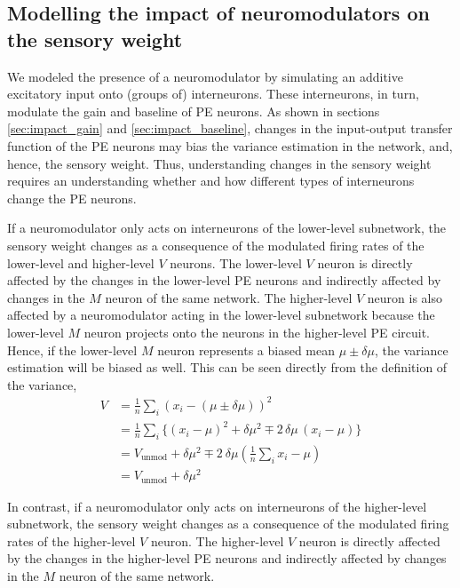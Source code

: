\documentclass[10pt,a4paper,draft]{article}
\begin{document}
\subsection{Modelling the impact of neuromodulators on the sensory weight}
%
We modeled the presence of a neuromodulator by simulating an additive excitatory input onto (groups of) interneurons. These interneurons, in turn, modulate the gain and baseline of PE neurons. As shown in sections \ref{sec:impact_gain} and \ref{sec:impact_baseline}, changes in the input-output transfer function of the PE neurons may bias the variance estimation in the network, and, hence, the sensory weight. Thus, understanding changes in the sensory weight requires an understanding whether and how different types of interneurons change the PE neurons.

If a neuromodulator only acts on interneurons of the lower-level subnetwork, the sensory weight changes as a consequence of the modulated firing rates of the lower-level and higher-level $V$ neurons. The lower-level $V$ neuron is directly affected by the changes in the lower-level PE neurons and indirectly affected by changes in the $M$ neuron of the same network. The higher-level $V$ neuron is also affected by a neuromodulator acting in the lower-level subnetwork because the lower-level $M$ neuron projects onto the neurons in the higher-level PE circuit. Hence, if the lower-level $M$ neuron represents a biased mean $\mu \pm \delta\mu$, the variance estimation will be biased as well. This can be seen directly from the definition of the variance,
%
\begin{align*}
V &= \frac{1}{n} \sum_i \left( x_i - \left(\mu \pm \delta\mu\right)\right)^2 \\
&= \frac{1}{n} \sum_i \lbrace  \left( x_i - \mu \right)^2 + \delta\mu^2 \mp 2\, \delta\mu\,  (x_i - \mu)\rbrace \\
&= V_\mathrm{unmod} + \delta\mu^2 \mp 2\ \delta\mu \left( \frac{1}{n} \sum_i x_i- \mu\right) \\
&= V_\mathrm{unmod} + \delta\mu^2
\end{align*}
%

In contrast, if a neuromodulator only acts on interneurons of the higher-level subnetwork, the sensory weight changes as a consequence of the modulated firing rates of the higher-level $V$ neuron. The higher-level $V$ neuron is directly affected by the changes in the higher-level PE neurons and indirectly affected by changes in the $M$ neuron of the same network.
\end{document}
